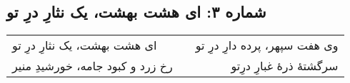\begin{center}
\section*{شماره ۳: ای هشت بهشت، یک نثارِ درِ تو}
\label{sec:003}
\begin{longtable}{l p{0.5cm} r}
ای هشت بهشت، یک نثارِ درِ تو
&&
وی هفت سپهر، پرده دارِ درِ تو
\\
رخ زرد و کبود جامه، خورشیدِ منیر
&&
سرگشتهٔ ذرهٔ غبارِ درِتو
\\
\end{longtable}
\end{center}
